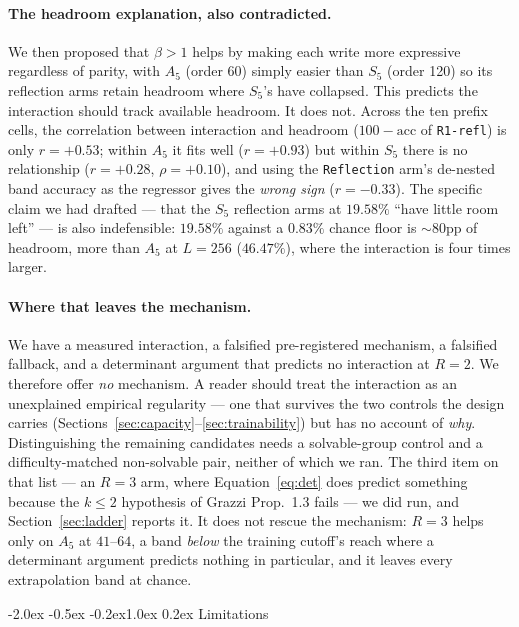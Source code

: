 \documentclass[10pt,twocolumn]{article}
\makeatletter
\renewcommand\section{\@startsection{section}{1}{\z@}%
  {-2.0ex \@plus -0.5ex \@minus -0.2ex}{1.0ex \@plus 0.2ex}%
  {\normalfont\large\bfseries}}
\makeatother
\begin{document}
\paragraph{The headroom explanation, also contradicted.}
We then proposed that $\beta>1$ helps by making each write more expressive
regardless of parity, with $A_5$ (order 60) simply easier than $S_5$ (order 120)
so its reflection arms retain headroom where $S_5$'s have collapsed. This
predicts the interaction should track available headroom. It does not. Across
the ten prefix cells, the correlation between interaction and headroom
($100 - \mathrm{acc}$ of \texttt{R1-refl}) is only $r=+0.53$; within $A_5$ it
fits well ($r=+0.93$) but within $S_5$ there is no relationship ($r=+0.28$,
$\rho=+0.10$), and using the \texttt{Reflection} arm's de-nested band accuracy
as the regressor gives the \emph{wrong sign} ($r=-0.33$). The specific claim we
had drafted --- that the $S_5$ reflection arms at $19.58\%$ ``have little room
left'' --- is also indefensible: $19.58\%$ against a $0.83\%$ chance floor is
$\sim$80pp of headroom, more than $A_5$ at $L=256$ ($46.47\%$), where the
interaction is four times larger.

\paragraph{Where that leaves the mechanism.}
We have a measured interaction, a falsified pre-registered mechanism, a
falsified fallback, and a determinant argument that predicts no interaction at
$R=2$. We therefore offer \emph{no} mechanism. A reader should treat the
interaction as an unexplained empirical regularity --- one that survives the two
controls the design carries (Sections~\ref{sec:capacity}--\ref{sec:trainability})
but has no account of \emph{why}. Distinguishing the remaining candidates needs a
solvable-group control and a difficulty-matched non-solvable pair, neither of
which we ran. The third item on that list --- an $R=3$ arm, where
Equation~\eqref{eq:det} does predict something because the $k\le2$ hypothesis of
Grazzi Prop.~1.3 fails --- we did run, and Section~\ref{sec:ladder} reports it.
It does not rescue the mechanism: $R{=}3$ helps only on $A_5$ at $41$--$64$, a
band \emph{below} the training cutoff's reach where a determinant argument
predicts nothing in particular, and it leaves every extrapolation band at chance.

\section{Limitations}
\label{sec:limitations}
\end{document}
